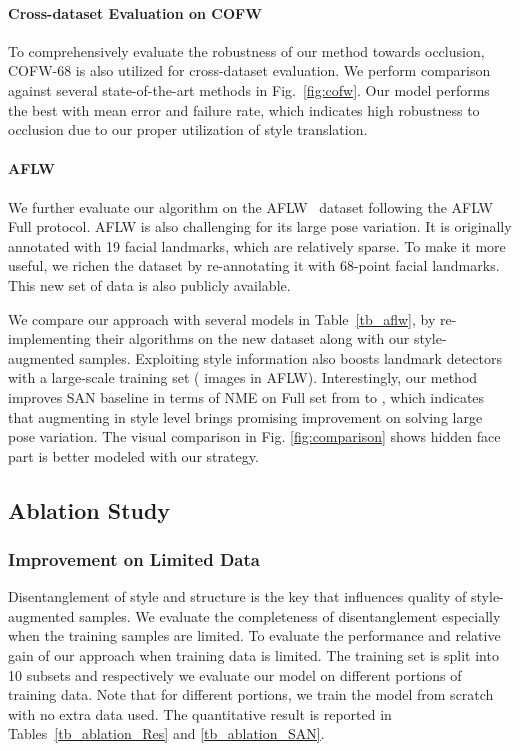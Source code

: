 \documentclass[10pt,twocolumn,letterpaper]{article}
\begin{document}
\vspace{-0.12in}
\paragraph{Cross-dataset Evaluation on COFW}
To comprehensively evaluate the robustness of our method towards occlusion, COFW-68 is also utilized for cross-dataset evaluation. We perform comparison against several state-of-the-art methods in Fig.~\ref{fig:cofw}. Our model performs the best with  mean error and  failure rate, which indicates high robustness to occlusion due to our proper utilization of style translation. 



\vspace{-0.12in}
\paragraph{AFLW}
We further evaluate our algorithm on the AFLW~\cite{AFLW} dataset following the AFLW Full protocol. AFLW is also challenging for its large pose variation. It is originally annotated with 19 facial landmarks, which are relatively sparse. To make it more useful, we richen the dataset by re-annotating it with 68-point facial landmarks. This new set of data is also publicly available.

We compare our approach with several models in Table~\ref{tb_aflw}, by re-implementing their algorithms on the new dataset along with our style-augmented samples. Exploiting style information also boosts landmark detectors with a large-scale training set ( images in AFLW). Interestingly, our method improves SAN baseline in terms of NME on Full set from  to , which indicates that augmenting in style level brings promising improvement on solving large pose variation. The visual comparison in Fig. \ref{fig:comparison} shows hidden face part is better modeled with our strategy.

\subsection{Ablation Study}

\subsubsection{Improvement on Limited Data}
Disentanglement of style and structure is the key that influences quality of style-augmented samples. We evaluate the completeness of disentanglement especially when the training samples are limited. To evaluate the performance and relative gain of our approach when training data is limited. The training set is split into 10 subsets and respectively we evaluate our model on different portions of training data. Note that for different portions, we train the model from scratch with no extra data used. The quantitative result is reported in Tables~\ref{tb_ablation_Res} and \ref{tb_ablation_SAN}.
\end{document}
